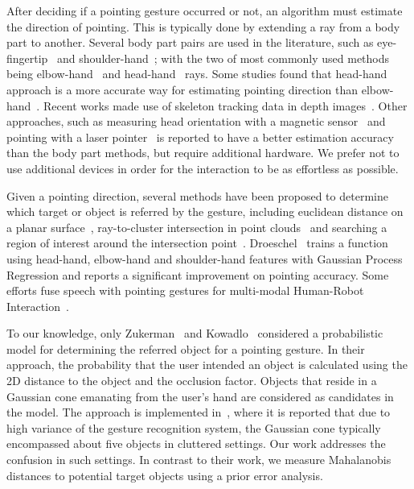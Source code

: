 After deciding if a pointing gesture occurred or not, an algorithm must estimate the direction of pointing. This is typically done by extending a ray from a body part to another. Several body part pairs are used in the literature, such as eye-fingertip~\cite{kehl2004real} and shoulder-hand~\cite{hosoya2004arm}; with the two of most commonly used methods being elbow-hand~\cite{raza2013human, brooks2006working, blodow2011inferring} and head-hand~\cite{bennewitz2008robust, schmidt2008interacting} rays. Some studies found that head-hand approach is a more accurate way for estimating pointing direction than elbow-hand~\cite{quintero2013sepo, droeschel2011towards}. Recent works made use of skeleton tracking data  in depth images~\cite{quintero2013sepo, blodow2011inferring, raza2013human}. Other approaches, such as measuring head orientation with a magnetic sensor~\cite{nickel2003pointing} and pointing with a laser pointer~\cite{cheng2009hand, kemp2008point} is reported to have a better estimation accuracy than the body part methods, but require additional hardware. We prefer not to use additional devices in order for the interaction to be as effortless as possible.

Given a pointing direction, several methods have been proposed to determine which target or object is referred by the gesture, including euclidean distance on a planar surface~\cite{cheng2009hand}, ray-to-cluster intersection in point clouds~\cite{blodow2011inferring, quintero2013sepo} and searching a region of interest around the intersection point~\cite{schmidt2008interacting}. Droeschel~\cite{droeschel2011learning} trains a function using head-hand, elbow-hand and shoulder-hand features with Gaussian Process Regression and reports a significant improvement on pointing accuracy. Some efforts fuse speech with pointing gestures for multi-modal Human-Robot Interaction~\cite{aly2012integrated,kowadlo2010influence}.

To our knowledge, only Zukerman~\cite{zukerman2011speaking} and Kowadlo~\cite{kowadlo2010influence} considered a probabilistic model for determining the referred object for a pointing gesture. In their approach, the probability that the user intended an object is calculated using the 2D distance to the object and the occlusion factor. Objects that reside in a Gaussian cone emanating from the user's hand are considered as candidates in the model. The approach is implemented in~\cite{zukerman2011speaking}, where it is reported that due to high variance of the gesture recognition system, the Gaussian cone typically encompassed about five objects in cluttered settings. Our work addresses the confusion in such settings. In contrast to their work, we measure Mahalanobis distances to potential target objects using a prior error analysis.

